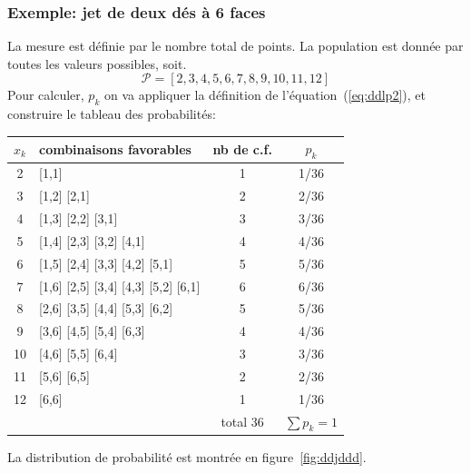 \documentclass[main.tex]{subfiles}
\begin{document}
\subsubsection*{Exemple: jet de deux dés à 6 faces}

La mesure est définie par le nombre total de points. La population est donnée par toutes les valeurs possibles, soit.
$$
    \mathcal{P}=[2,3,4,5,6,7,8,9,10,11,12]
$$
Pour calculer, $p_k$ on va appliquer la définition de l'équation~(\ref{eq:ddlp2}), et construire le tableau des probabilités:
\begin{center}
    \begin{tabular}{clcc}
        $x_k$ & combinaisons favorables             & nb de c.f. & $p_k$        \\\hline
        2     & [1,1]                               & 1          & 1/36         \\
        3     & [1,2] [2,1]                         & 2          & 2/36         \\
        4     & [1,3] [2,2] [3,1]                   & 3          & 3/36         \\
        5     & [1,4] [2,3] [3,2] [4,1]             & 4          & 4/36         \\
        6     & [1,5] [2,4] [3,3] [4,2] [5,1]       & 5          & 5/36         \\
        7     & [1,6] [2,5] [3,4] [4,3] [5,2] [6,1] & 6          & 6/36         \\
        8     & [2,6] [3,5] [4,4] [5,3] [6,2]       & 5          & 5/36         \\
        9     & [3,6] [4,5] [5,4] [6,3]             & 4          & 4/36         \\
        10    & [4,6] [5,5] [6,4]                   & 3          & 3/36         \\
        11    & [5,6] [6,5]                         & 2          & 2/36         \\
        12    & [6,6]                               & 1          & 1/36         \\\hline
              &                                     & total 36   & $\sum p_k=1$
    \end{tabular}
\end{center}
La distribution de probabilité est montrée en figure~\ref{fig:ddjddd}.
\end{document}
